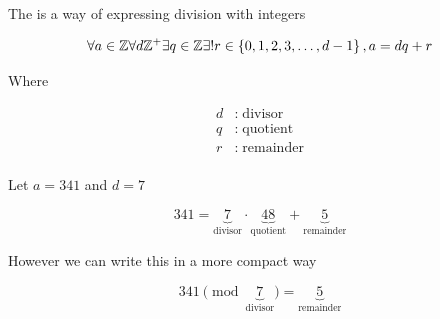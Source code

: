 \documentclass[../../Main.tex]{subfiles}
\begin{document}
\begin{definition}
    The  is a way of expressing division with integers

    $$ \forall a \in \mathbb{Z} \forall d \mathbb{Z}^+ \exists q \in \mathbb{Z} \exists ! r \in \left\{0, 1, 2, 3, \ldots, d - 1\right\}, a = dq + r $$

    Where

    \begin{align*}
        d &: \; \text{divisor} \\
        q &: \; \text{quotient} \\
        r &: \; \text{remainder} \\
    \end{align*}

\end{definition}

\begin{example}
    Let $a = 341$ and $d = 7$

    $$ 341 = \underbrace{7}_{\text{divisor}} \cdot \underbrace{48}_{\text{quotient}} + \underbrace{5}_{\text{remainder}}$$
\end{example}

However we can write this in a more compact way

$$ 341 \pmod{\underbrace{7}_{\text{divisor}}} = \underbrace{5}_{\text{remainder}} $$
\end{document}
